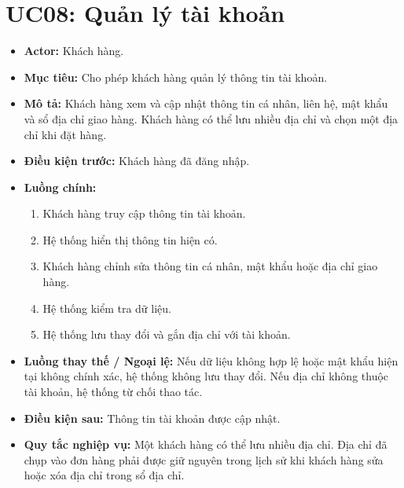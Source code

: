 \section{UC08: Quản lý tài khoản}
\begin{itemize}
    \item \textbf{Actor:} Khách hàng.
    \item \textbf{Mục tiêu:} Cho phép khách hàng quản lý thông tin tài khoản.
    \item \textbf{Mô tả:} Khách hàng xem và cập nhật thông tin cá nhân, liên hệ, mật khẩu và sổ địa chỉ giao hàng. Khách hàng có thể lưu nhiều địa chỉ và chọn một địa chỉ khi đặt hàng.
    \item \textbf{Điều kiện trước:} Khách hàng đã đăng nhập.
    \item \textbf{Luồng chính:}
    \begin{enumerate}
        \item Khách hàng truy cập thông tin tài khoản.
        \item Hệ thống hiển thị thông tin hiện có.
        \item Khách hàng chỉnh sửa thông tin cá nhân, mật khẩu hoặc địa chỉ giao hàng.
        \item Hệ thống kiểm tra dữ liệu.
        \item Hệ thống lưu thay đổi và gắn địa chỉ với tài khoản.
    \end{enumerate}
    \item \textbf{Luồng thay thế / Ngoại lệ:} Nếu dữ liệu không hợp lệ hoặc mật khẩu hiện tại không chính xác, hệ thống không lưu thay đổi. Nếu địa chỉ không thuộc tài khoản, hệ thống từ chối thao tác.
    \item \textbf{Điều kiện sau:} Thông tin tài khoản được cập nhật.
    \item \textbf{Quy tắc nghiệp vụ:} Một khách hàng có thể lưu nhiều địa chỉ. Địa chỉ đã chụp vào đơn hàng phải được giữ nguyên trong lịch sử khi khách hàng sửa hoặc xóa địa chỉ trong sổ địa chỉ.
\end{itemize}

